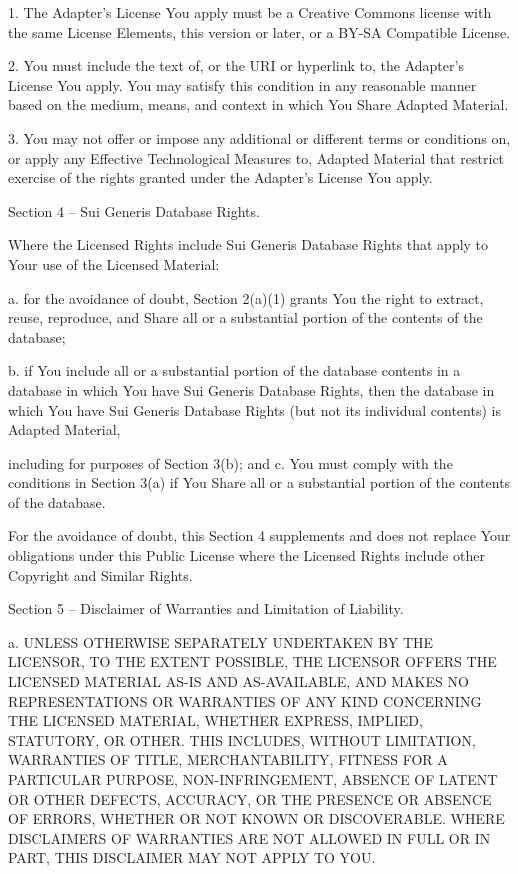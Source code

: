        1. The Adapter's License You apply must be a Creative Commons
          license with the same License Elements, this version or
          later, or a BY-SA Compatible License.

       2. You must include the text of, or the URI or hyperlink to, the
          Adapter's License You apply. You may satisfy this condition
          in any reasonable manner based on the medium, means, and
          context in which You Share Adapted Material.

       3. You may not offer or impose any additional or different terms
          or conditions on, or apply any Effective Technological
          Measures to, Adapted Material that restrict exercise of the
          rights granted under the Adapter's License You apply.


Section 4 -- Sui Generis Database Rights.

Where the Licensed Rights include Sui Generis Database Rights that
apply to Your use of the Licensed Material:

  a. for the avoidance of doubt, Section 2(a)(1) grants You the right
     to extract, reuse, reproduce, and Share all or a substantial
     portion of the contents of the database;

  b. if You include all or a substantial portion of the database
     contents in a database in which You have Sui Generis Database
     Rights, then the database in which You have Sui Generis Database
     Rights (but not its individual contents) is Adapted Material,

     including for purposes of Section 3(b); and
  c. You must comply with the conditions in Section 3(a) if You Share
     all or a substantial portion of the contents of the database.

For the avoidance of doubt, this Section 4 supplements and does not
replace Your obligations under this Public License where the Licensed
Rights include other Copyright and Similar Rights.


Section 5 -- Disclaimer of Warranties and Limitation of Liability.

  a. UNLESS OTHERWISE SEPARATELY UNDERTAKEN BY THE LICENSOR, TO THE
     EXTENT POSSIBLE, THE LICENSOR OFFERS THE LICENSED MATERIAL AS-IS
     AND AS-AVAILABLE, AND MAKES NO REPRESENTATIONS OR WARRANTIES OF
     ANY KIND CONCERNING THE LICENSED MATERIAL, WHETHER EXPRESS,
     IMPLIED, STATUTORY, OR OTHER. THIS INCLUDES, WITHOUT LIMITATION,
     WARRANTIES OF TITLE, MERCHANTABILITY, FITNESS FOR A PARTICULAR
     PURPOSE, NON-INFRINGEMENT, ABSENCE OF LATENT OR OTHER DEFECTS,
     ACCURACY, OR THE PRESENCE OR ABSENCE OF ERRORS, WHETHER OR NOT
     KNOWN OR DISCOVERABLE. WHERE DISCLAIMERS OF WARRANTIES ARE NOT
     ALLOWED IN FULL OR IN PART, THIS DISCLAIMER MAY NOT APPLY TO YOU.


